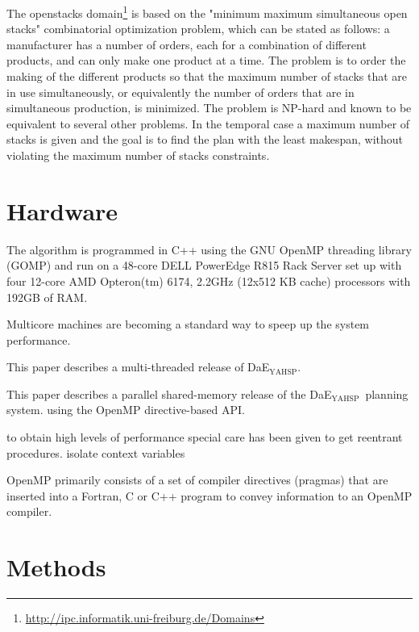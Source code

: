 \documentclass{sig-alternate}
\newcommand{\DAEYAHSP}{{\sc DaE$_{\text{YAHSP}}$}}
\begin{document}
The openstacks domain\footnote{\url{http://ipc.informatik.uni-freiburg.de/Domains}} is based on the "minimum maximum simultaneous open stacks" combinatorial optimization problem, which can be stated as follows: a manufacturer has a number of orders, each for a combination of different products, and can only make one product at a time. The problem is to order the making of the different products so that the maximum number of stacks that are in use simultaneously, or equivalently the number of orders that are in simultaneous production, is minimized. The problem is NP-hard and known to be equivalent to several other problems. In the temporal case a maximum number of stacks is given and the goal is to find the plan with the least makespan, without violating the maximum number of stacks constraints.


\section{Hardware}
The algorithm is programmed in C++ using the GNU OpenMP threading library (GOMP) and run on a 48-core DELL PowerEdge R815 Rack Server set up with four 12-core AMD Opteron(tm) 6174, 2.2GHz (12x512 KB cache) processors with 192GB of RAM.

Multicore machines are becoming a standard way to speep up the system performance.

This paper describes a multi-threaded release of \DAEYAHSP.

This paper describes a parallel shared-memory release of the \DAEYAHSP\ planning system.
using the OpenMP directive-based API.

to obtain high levels of performance special care has been given to get reentrant procedures.
isolate context variables 


OpenMP primarily consists of a set of compiler directives (pragmas) that are inserted into a Fortran, C or C++ program to convey information to an OpenMP compiler.


\cite{paradiseo:JHeuristics2004}
\cite{paradiseo:ParallelComputing2004}
\cite{alba:IEEE2002}
\cite{alba:COR2008}
\cite{alba:IPL2002}
\cite{burns:JAIR2010}
\cite{burns:icaps2009}
\cite{burns:ijcai2009}
\cite{vidal:socs2010}
\cite{dae:icaps2010}
\cite{dae:evocop2006}
\cite{dae:gecco2010}
\cite{yahsp:icaps2004}

\section{Methods}
\end{document}
